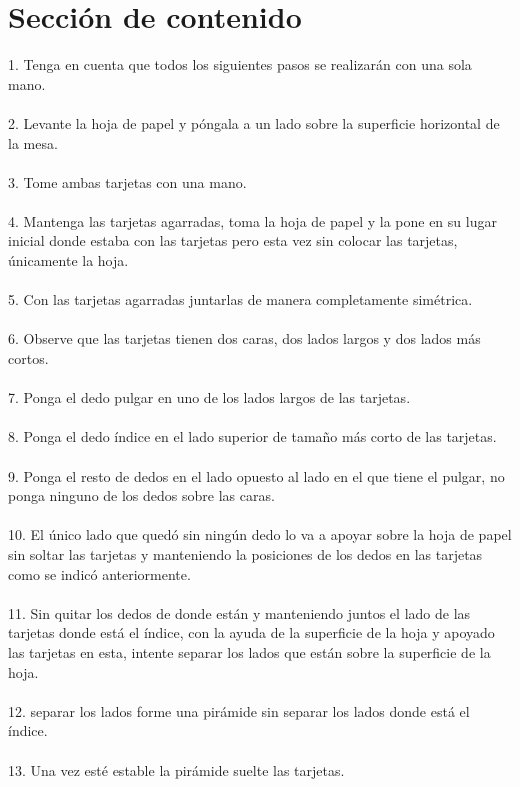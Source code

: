 \documentclass{article}
\begin{document}
\section{Sección de contenido} \label{contenido}
1. Tenga en cuenta que todos los siguientes pasos se realizarán con una sola mano.\\\\
2. Levante la hoja de papel y póngala a un lado sobre la superficie horizontal de la mesa.\\\\
3. Tome ambas tarjetas con una mano.\\\\
4. Mantenga las tarjetas agarradas, toma la hoja de papel y la pone en su lugar inicial donde estaba con las tarjetas pero esta vez sin colocar las tarjetas, únicamente la hoja.\\\\
5. Con las tarjetas agarradas juntarlas de manera completamente simétrica.\\\\
6. Observe que las tarjetas tienen dos caras, dos lados largos y dos lados más cortos.\\\\
7. Ponga el dedo pulgar en uno de los lados largos de las tarjetas.\\\\
8. Ponga el dedo índice en el lado superior de tamaño más corto de las tarjetas.\\\\
9. Ponga el resto de dedos en el lado opuesto al lado en el que tiene el pulgar, no ponga ninguno de los dedos sobre las caras.\\\\
10. El único lado que quedó sin ningún dedo lo va a apoyar sobre la hoja de papel sin soltar las tarjetas y manteniendo la posiciones de los dedos en las tarjetas como se indicó anteriormente.\\\\
11. Sin quitar los dedos de donde están y manteniendo juntos el lado de las tarjetas donde está el índice, con la ayuda de la superficie de la hoja y apoyado las tarjetas en esta, intente separar los lados que están sobre la superficie de la hoja.\\\\
12. separar los lados forme una pirámide sin separar los lados donde está el índice.\\\\
13. Una vez esté estable la pirámide suelte las tarjetas.



\end{document}
